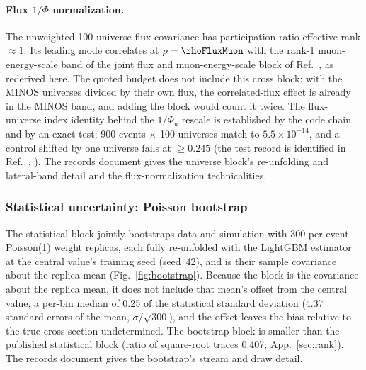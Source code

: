 \paragraph{Flux $1/\Phi$ normalization.} The unweighted 100-universe flux covariance has participation-ratio effective rank $\approx1$. Its leading mode correlates at $\rho=\rhoFluxMuon$ with the rank-1 muon-energy-scale band of the joint flux and muon-energy-scale block of Ref.~\cite{Bashyal:2021tqu}, as rederived here. The quoted budget does not include this cross block: with the MINOS universes divided by their own flux, the correlated-flux effect is already in the MINOS band, and adding the block would count it twice. The flux-universe index identity behind the $1/\Phi_{u}$ rescale is established by the code chain and by an exact test: 900 events $\times$ 100 universes match to $5.5\times10^{-14}$, and a control shifted by one universe fails at $\ge0.245$ (the test record is identified in Ref.~\cite{NoteRecords2026}, ). The records document gives the universe block's re-unfolding and lateral-band detail and the flux-normalization technicalities.

\subsubsection{Statistical uncertainty: Poisson bootstrap}
\label{sec:uq-boot}
The statistical block jointly bootstraps data and simulation with 300 per-event Poisson(1) weight replicas, each fully re-unfolded with the LightGBM estimator at the central value's training seed (seed~42), and is their sample covariance about the replica mean (Fig.~\ref{fig:bootstrap}). Because the block is the covariance about the replica mean, it does not include that mean's offset from the central value, a per-bin median of 0.25 of the statistical standard deviation (4.37 standard errors of the mean, $\sigma/\sqrt{300}$), and the offset leaves the bias relative to the true cross section undetermined. The bootstrap block is smaller than the published statistical block (ratio of square-root traces 0.407; App.~\ref{sec:rank}). The records document gives the bootstrap's stream and draw detail.

